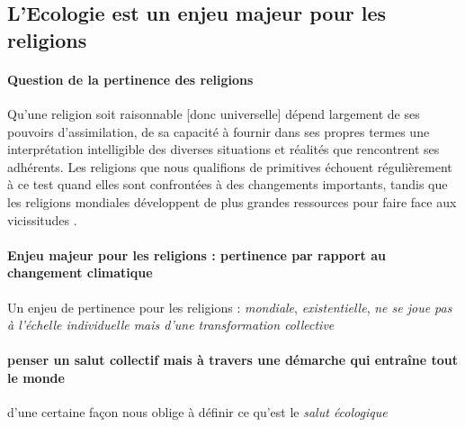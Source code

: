 \newpage

\subsection{L'Ecologie est un enjeu majeur pour les religions}

\paragraph{Question de la pertinence des religions}
\begin{singlequote}
        Qu’une religion soit raisonnable [donc universelle] dépend largement de ses
pouvoirs d’assimilation, de sa capacité à fournir dans ses propres termes une
interprétation intelligible des diverses situations et réalités que rencontrent
ses adhérents. Les religions que nous qualifions de primitives échouent régulièrement
à ce test quand elles sont confrontées à des changements importants,
tandis que les religions mondiales développent de plus grandes ressources pour
faire face aux vicissitudes \cite[ p. 175]{lindbeck_nature_2002}.
\end{singlequote}
\paragraph{Enjeu majeur pour les religions : pertinence par rapport au changement climatique}

 Un enjeu de pertinence pour les religions : \textit{mondiale}, \textit{existentielle}, \textit{ne se joue pas à l'échelle individuelle mais d'une transformation collective}

\paragraph{penser un salut collectif mais à travers une démarche qui entraîne tout le monde } d'une certaine façon nous oblige à définir ce qu'est le \textit{salut écologique} 
\label{Comment:MemoireISTR1}






